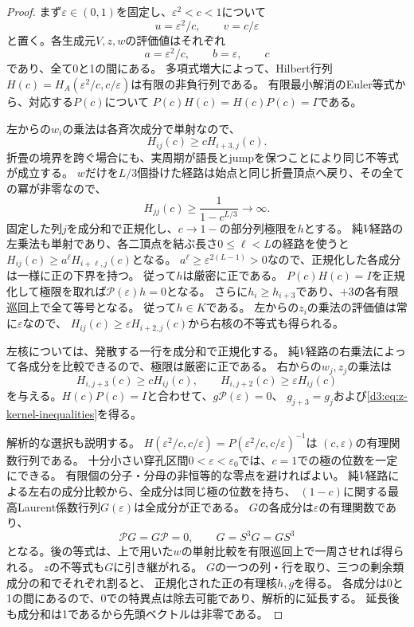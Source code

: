 \documentclass[11pt,a4paper]{ltjsarticle}
\theoremstyle{definition}
\begin{document}
\begin{proof}
まず$\varepsilon\in(0,1)$を固定し、$\varepsilon^2<c<1$について
\[
u=\varepsilon^2/c,\qquad v=c/\varepsilon
\]
と置く。各生成元$V,z,w$の評価値はそれぞれ
\[
a=\varepsilon^2/c,\qquad b=\varepsilon,\qquad c
\]
であり、全て0と1の間にある。
多項式増大によって、Hilbert行列$H(c)=H_A(\varepsilon^2/c,c/\varepsilon)$は有限の非負行列である。
有限最小解消のEuler等式から、対応する$P(c)$について
$P(c)H(c)=H(c)P(c)=I$である。

左からの$w_i$の乗法は各斉次成分で単射なので、
\[
H_{ij}(c)\ge cH_{i+3,j}(c).
\]
折畳の境界を跨ぐ場合にも、実周期が語長とjumpを保つことにより同じ不等式が成立する。
$w$だけを$L/3$個掛けた経路は始点と同じ折畳頂点へ戻り、その全ての冪が非零なので、
\[
H_{jj}(c)\ge\frac1{1-c^{L/3}}\longrightarrow\infty.
\]
固定した列$j$を成分和で正規化し、$c\to1-$の部分列極限を$h$とする。
純$V$経路の左乗法も単射であり、各二頂点を結ぶ長さ$0\le\ell<L$の経路を使うと
$H_{ij}(c)\ge a^\ell H_{i+\ell,j}(c)$となる。
$a^\ell\ge\varepsilon^{2(L-1)}>0$なので、正規化した各成分は一様に正の下界を持つ。
従って$h$は厳密に正である。
$P(c)H(c)=I$を正規化して極限を取れば$\mathscr P(\varepsilon)h=0$となる。
さらに$h_i\ge h_{i+3}$であり、$+3$の各有限巡回上で全て等号となる。
従って$h\in K$である。
左からの$z_i$の乗法の評価値は常に$\varepsilon$なので、
$H_{ij}(c)\ge\varepsilon H_{i+2,j}(c)$から右核の不等式も得られる。

左核については、発散する一行を成分和で正規化する。
純$V$経路の右乗法によって各成分を比較できるので、極限は厳密に正である。
右からの$w_j,z_j$の乗法は
\[
H_{i,j+3}(c)\ge cH_{ij}(c),\qquad
H_{i,j+2}(c)\ge\varepsilon H_{ij}(c)
\]
を与える。$H(c)P(c)=I$と合わせて、$g\mathscr P(\varepsilon)=0$、
$g_{j+3}=g_j$および\eqref{d3:eq:z-kernel-inequalities}を得る。

解析的な選択も説明する。
$H(\varepsilon^2/c,c/\varepsilon)=P(\varepsilon^2/c,c/\varepsilon)^{-1}$は
$(c,\varepsilon)$の有理関数行列である。
十分小さい穿孔区間$0<\varepsilon<\varepsilon_0$では、$c=1$での極の位数を一定にできる。
有限個の分子・分母の非恒等的な零点を避ければよい。
純$V$経路による左右の成分比較から、全成分は同じ極の位数を持ち、
$(1-c)$に関する最高Laurent係数行列$G(\varepsilon)$は全成分が正である。
$G$の各成分は$\varepsilon$の有理関数であり、
\[
 \mathscr P G=G\mathscr P=0,\qquad
 G=S^3G=GS^3
\]
となる。後の等式は、上で用いた$w$の単射比較を有限巡回上で一周させれば得られる。
$z$の不等式も$G$に引き継がれる。
$G$の一つの列・行を取り、三つの剰余類成分の和でそれぞれ割ると、
正規化された正の有理核$h,g$を得る。
各成分は0と1の間にあるので、0での特異点は除去可能であり、解析的に延長する。
延長後も成分和は1であるから先頭ベクトルは非零である。
\end{proof}
\end{document}
